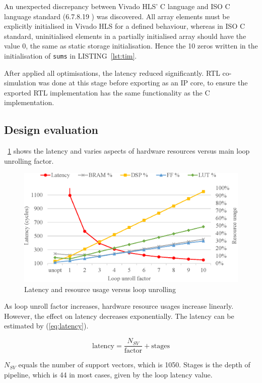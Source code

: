 \documentclass[journal]{IEEEtran}
\newcommand{\fref}[1]{\figurename~\ref{#1}}
\newcommand{\eref}[1]{(\ref{#1})}
\newcommand{\lref}[1]{LISTING~\ref{#1}}
\begin{document}
An unexpected discrepancy between Vivado HLS' C language and ISO C language standard (6.7.8.19 \cite{iso1999iec}) was discovered. All array elements must be explicitly initialised in Vivado HLS for a defined behaviour, whereas in ISO C standard, uninitialised elements in a partially initialised array should have the value 0, the same as static storage initialisation. Hence the 10 zeros written in the initialisation of \texttt{sums} in \lref{lst:tim}.

After applied all optimisations, the latency reduced significantly. RTL co-simulation was done at this stage before exporting as an IP core, to ensure the exported RTL implementation has the same functionality as the C implementation.

\subsection{Design evaluation}

\fref{fig:latency} shows the latency and varies aspects of hardware resources versus main loop unrolling factor.

\begin{figure}[ht]
	\centering
	\includegraphics[width=\columnwidth]{latency}
	\caption{Latency and resource usage versus loop unrolling}
	\label{fig:latency}
\end{figure}

As loop unroll factor increases, hardware resource usages increase linearly. However, the effect on latency decreases exponentially. The latency can be estimated by \eref{eq:latency}.

\begin{equation}
	\text{latency} = \frac{N_{SV}}{\text{factor}} + \text{stages}
	\label{eq:latency}
\end{equation}

$N_{SV}$ equals the number of support vectors, which is 1050. Stages is the depth of pipeline, which is 44 in most cases, given by the loop latency value.
\end{document}
